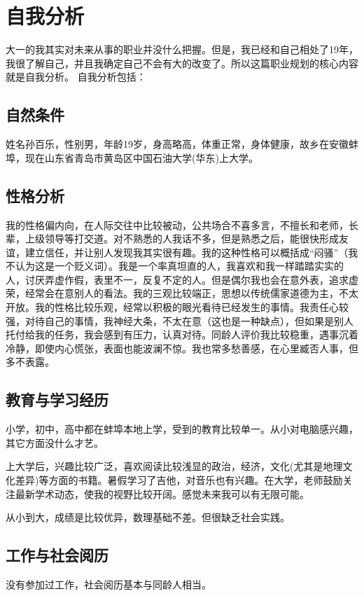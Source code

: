 \documentclass{article}
\begin{document}
\thispagestyle{empty}
\newpage
\setcounter{page}{1}
\section{自我分析}
	大一的我其实对未来从事的职业并没什么把握。但是，我已经和自己相处了19年，我很了解自己，并且我确定自己不会有大的改变了。所以这篇职业规划的核心内容就是自我分析。
	自我分析包括：
\subsection{自然条件}
姓名孙百乐，性别男，年龄19岁，身高略高，体重正常，身体健康，故乡在安徽蚌埠，现在山东省青岛市黄岛区中国石油大学(华东)上大学。\par
\subsection{性格分析}
我的性格偏内向，在人际交往中比较被动，公共场合不喜多言，不擅长和老师，长辈，上级领导等打交道。对不熟悉的人我话不多，但是熟悉之后，能很快形成友谊，建立信任，并让别人发现我其实很有趣。我的这种性格可以概括成“闷骚”（我不认为这是一个贬义词）。我是一个率真坦直的人，我喜欢和我一样踏踏实实的人，讨厌弄虚作假，表里不一，反复不定的人。但是偶尔我也会在意外表，追求虚荣，经常会在意别人的看法。我的三观比较端正，思想以传统儒家道德为主，不太开放。我的性格比较乐观，经常以积极的眼光看待已经发生的事情。我责任心较强，对待自己的事情，我神经大条，不太在意（这也是一种缺点），但如果是别人托付给我的任务，我会感到有压力，认真对待。同龄人评价我比较稳重，遇事沉着冷静，即使内心慌张，表面也能波澜不惊。我也常多愁善感，在心里臧否人事，但多不表露。\par
\subsection{教育与学习经历}
小学，初中，高中都在蚌埠本地上学，受到的教育比较单一。从小对电脑感兴趣，其它方面没什么才艺。\par
上大学后，兴趣比较广泛，喜欢阅读比较浅显的政治，经济，文化(尤其是地理文化差异)等方面的书籍。暑假学习了吉他，对音乐也有兴趣。在大学，老师鼓励关注最新学术动态，使我的视野比较开阔。感觉未来我可以有无限可能。\par
从小到大，成绩是比较优异，数理基础不差。但很缺乏社会实践。
\subsection{工作与社会阅历}
没有参加过工作，社会阅历基本与同龄人相当。\par
\end{document}

